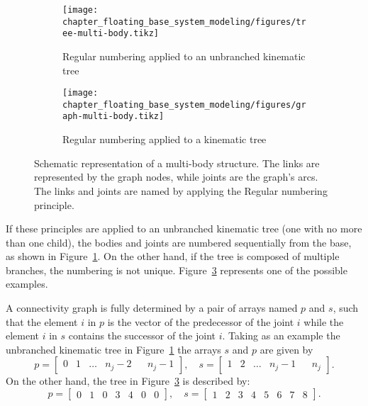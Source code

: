 \begin{figure}[tpb]
\centering
    \begin{subfigure}[b]{1\textwidth}
        \centering
        \texttt{[image: chapter\_floating\_base\_system\_modeling/figures/tree-multi-body.tikz]}
        \caption{Regular numbering applied to an unbranched kinematic tree}
        \label{fig:tree-multi-body}
    \end{subfigure}
    \vskip 0.5cm
    \begin{subfigure}[b]{1\textwidth}
        \centering
        \texttt{[image: chapter\_floating\_base\_system\_modeling/figures/graph-multi-body.tikz]}
        \caption{Regular numbering applied to a kinematic tree}
        \label{fig:graph-multi-body}
    \end{subfigure}
    \caption[Schematic representation of a multi-body structure.]{Schematic representation of a multi-body structure. The links are represented by the graph nodes, while joints are the graph's arcs. The links and joints are named by applying the Regular numbering principle.}
\end{figure}
If these principles are applied to an unbranched kinematic tree (one with no more than one child), the bodies and joints are numbered sequentially from the base, as shown in Figure~\ref{fig:tree-multi-body}. On the other hand, if the tree is composed of multiple branches, the numbering is not unique. Figure~\ref{fig:graph-multi-body} represents one of the possible examples.
\par
A connectivity graph is fully determined by a pair of arrays named $p$ and $s$, such that the element $i$ in $p$ is the vector of the predecessor of the joint $i$ while the element $i$ in $s$ contains the successor of the joint $i$. 
Taking as an example the unbranched kinematic tree in Figure~\ref{fig:tree-multi-body} the arrays $s$ and $p$ are given by
\begin{equation}
    p  = \begin{bmatrix}
    0 &1&\dots&n_j-2 & &n_j-1 
    \end{bmatrix}, \quad 
    s  = \begin{bmatrix}
    1 &2&\dots&n_j-1 & &n_j 
    \end{bmatrix}.
\end{equation}
On the other hand,  the tree in Figure~\ref{fig:graph-multi-body} is described by:
\begin{equation}
    p = \begin{bmatrix}
    0 & 1 & 0 & 3 & 4 & 0 & 0
    \end{bmatrix}, \quad 
    s = \begin{bmatrix}
    1 &2&3&4&5&6&7&8 
    \end{bmatrix}.
\end{equation}
